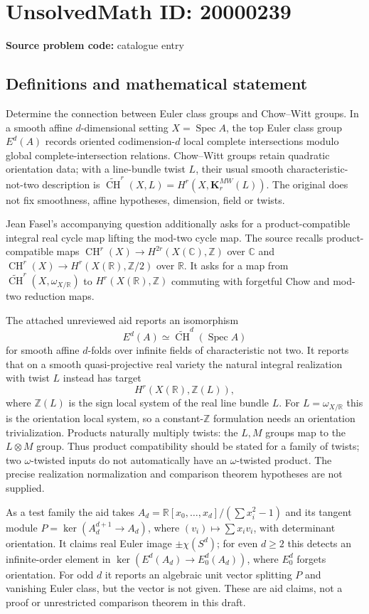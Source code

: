 \documentclass[11pt]{article}
\newcommand{\Z}{\mathbb{Z}}
\newcommand{\R}{\mathbb{R}}
\newcommand{\C}{\mathbb{C}}
\begin{document}
\section*{UnsolvedMath ID: 20000239}
\textbf{Source problem code:} catalogue entry
\subsection{Definitions and mathematical statement}
Determine the connection between Euler class groups and Chow--Witt groups. In a smooth affine $d$-dimensional setting $X=\operatorname{Spec}A$, the top Euler class group $E^d(A)$ records oriented codimension-$d$ local complete intersections modulo global complete-intersection relations. Chow--Witt groups retain quadratic orientation data; with a line-bundle twist $L$, their usual smooth characteristic-not-two description is $\widetilde{\operatorname{CH}}^r(X,L)=H^r(X,\mathbf K_r^{MW}(L))$. The original does not fix smoothness, affine hypotheses, dimension, field or twists.

Jean Fasel's accompanying question additionally asks for a product-compatible integral real cycle map lifting the mod-two cycle map. The source recalls product-compatible maps $\operatorname{CH}^r(X)\to H^{2r}(X(\C),\Z)$ over $\C$ and $\operatorname{CH}^r(X)\to H^r(X(\R),\Z/2)$ over $\R$. It asks for a map from $\widetilde{\operatorname{CH}}^r(X,\omega_{X/\R})$ to $H^r(X(\R),\Z)$ commuting with forgetful Chow and mod-two reduction maps.

The attached unreviewed aid reports an isomorphism
\[
E^d(A)\simeq\widetilde{\operatorname{CH}}^d(\operatorname{Spec}A)
\]
for smooth affine $d$-folds over infinite fields of characteristic not two. It reports that on a smooth quasi-projective real variety the natural integral realization with twist $L$ instead has target
\[
H^r(X(\R),\Z(L)),
\]
where $\Z(L)$ is the sign local system of the real line bundle $L$. For $L=\omega_{X/\R}$ this is the orientation local system, so a constant-$\Z$ formulation needs an orientation trivialization. Products naturally multiply twists: the $L,M$ groups map to the $L\otimes M$ group. Thus product compatibility should be stated for a family of twists; two $\omega$-twisted inputs do not automatically have an $\omega$-twisted product. The precise realization normalization and comparison theorem hypotheses are not supplied.

As a test family the aid takes $A_d=\R[x_0,\ldots,x_d]/(\sum x_i^2-1)$ and its tangent module $P=\ker(A_d^{d+1}\to A_d)$, where $(v_i)\mapsto\sum x_iv_i$, with determinant orientation. It claims real Euler image $\pm\chi(S^d)$; for even $d\ge2$ this detects an infinite-order element in $\ker(E^d(A_d)\to E_0^d(A_d))$, where $E_0^d$ forgets orientation. For odd $d$ it reports an algebraic unit vector splitting $P$ and vanishing Euler class, but the vector is not given. These are aid claims, not a proof or unrestricted comparison theorem in this draft.
\end{document}
